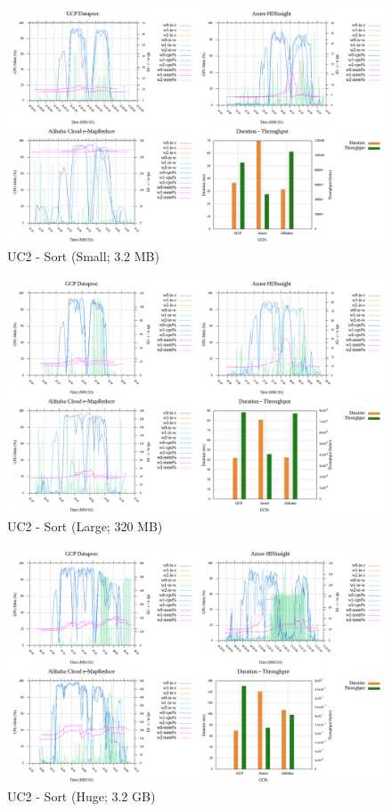 \documentclass[review]{elsarticle}
\begin{document}
\begin{figure}[p]
	\caption{UC2 - Sort (Small; 3.2 MB)}
	\label{fig:uc2-srt-s-cmidt}
	\includegraphics[width=\textwidth]{uc2-srt-s-cmidt}
	\centering
\end{figure}

\begin{figure}[p]
	\caption{UC2 - Sort (Large; 320 MB)}
	\label{fig:uc2-srt-l-cmidt}
	\includegraphics[width=\textwidth]{uc2-srt-l-cmidt}
	\centering
\end{figure}

\begin{figure}[p]
	\caption{UC2 - Sort (Huge; 3.2 GB)}
	\label{fig:uc2-srt-h-cmidt}
	\includegraphics[width=\textwidth]{uc2-srt-h-cmidt}
	\centering
\end{figure}
\end{document}
